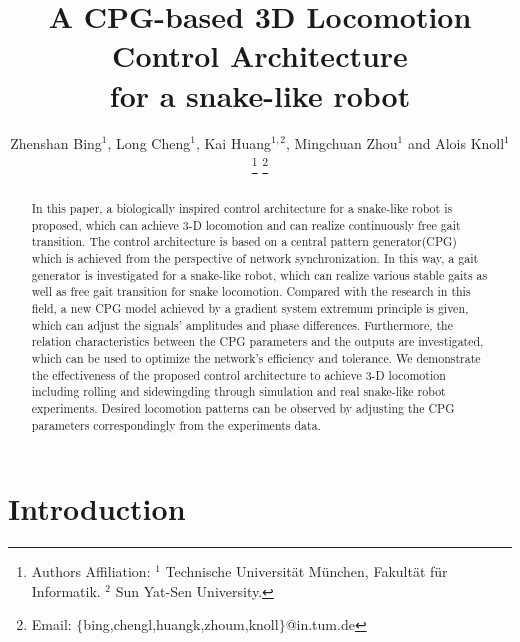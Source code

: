\documentclass[letterpaper, 10 pt, conference]{ieeeconf}
\begin{document}
\title{\LARGE \bf
A CPG-based 3D Locomotion Control Architecture\\
for a snake-like robot
}

\author{Zhenshan Bing$^1$, Long Cheng$^1$, Kai Huang$^{1,2}$, Mingchuan Zhou$^1$ and Alois Knoll$^1$
\thanks{Authors Affiliation: $^1$ Technische Universit\"at M\"unchen, Fakult\"at f\"ur Informatik. $^2$ Sun Yat-Sen University.}
\thanks{Email: $\{$bing,chengl,huangk,zhoum,knoll$\}$@in.tum.de}%
}

\maketitle


\begin{abstract}
In this paper, a biologically inspired control architecture for a snake-like robot is proposed, which can achieve 3-D locomotion and can realize continuously free gait transition.
The control architecture is based on a central pattern generator(CPG) which is achieved from the perspective of network synchronization.
In this way, a gait generator is investigated for a snake-like robot, which can realize various stable gaits as well as free gait transition for snake locomotion.
Compared with the research in this field, a new CPG model achieved by a gradient system extremum principle is given, which can adjust the signals' amplitudes and phase differences.
Furthermore, the relation characteristics between the CPG parameters and the outputs are investigated, which can be used to optimize the network's efficiency and tolerance.
We demonstrate the effectiveness of the proposed control architecture to achieve 3-D locomotion including rolling and sidewingding through simulation and real snake-like robot experiments. Desired locomotion patterns can be observed by adjusting the CPG parameters correspondingly from the experiments data.
\end{abstract}


\section{Introduction}
\end{document}
